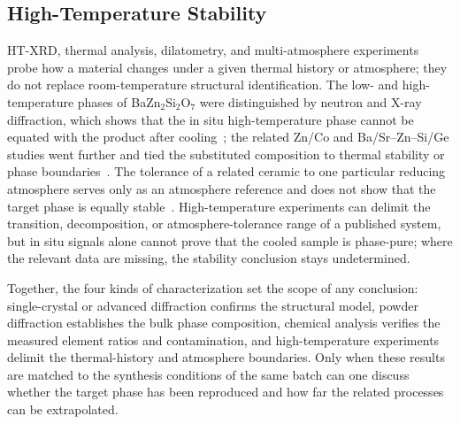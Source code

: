 \subsection{High-Temperature Stability}

HT\nobreakdash-XRD, thermal analysis, dilatometry, and multi-atmosphere experiments probe how a material changes under a given thermal history or atmosphere; they do not replace room-temperature structural identification. The low- and high-temperature phases of BaZn$_2$Si$_2$O$_7$ were distinguished by neutron and X-ray diffraction, which shows that the in situ high-temperature phase cannot be equated with the product after cooling~\cite{lin1999phase}; the related Zn\slash Co and Ba\slash Sr--Zn--Si\slash Ge studies went further and tied the substituted composition to thermal stability or phase boundaries~\cite{kerstan2013bazn2si2o7,thieme2016negative}. The tolerance of a related ceramic to one particular reducing atmosphere serves only as an atmosphere reference and does not show that the target phase is equally stable~\cite{zou2019anti}. High-temperature experiments can delimit the transition, decomposition, or atmosphere-tolerance range of a published system, but in situ signals alone cannot prove that the cooled sample is phase-pure; where the relevant data are missing, the stability conclusion stays undetermined.

Together, the four kinds of characterization set the scope of any conclusion: single-crystal or advanced diffraction confirms the structural model, powder diffraction establishes the bulk phase composition, chemical analysis verifies the measured element ratios and contamination, and high-temperature experiments delimit the thermal-history and atmosphere boundaries. Only when these results are matched to the synthesis conditions of the same batch can one discuss whether the target phase has been reproduced and how far the related processes can be extrapolated.
